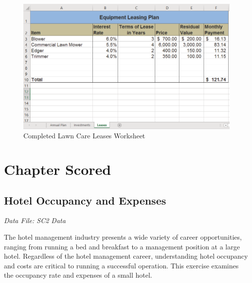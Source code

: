 \begin{figure}[H]
	\centering
	\includegraphics[width=\maxwidth{.95\linewidth}]{gfx/ch02_fig49}
	\caption{Completed Lawn Care Leases Worksheet}
	\label{02:fig49}
\end{figure}

\section{Chapter Scored}

\subsection{Hotel Occupancy and Expenses}

\textit{Data File: SC2 Data}

The hotel management industry presents a wide variety of career opportunities, ranging from running a bed and breakfast to a management position at a large hotel. Regardless of the hotel management career, understanding hotel occupancy and costs are critical to running a successful operation. This exercise examines the occupancy rate and expenses of a small hotel.

